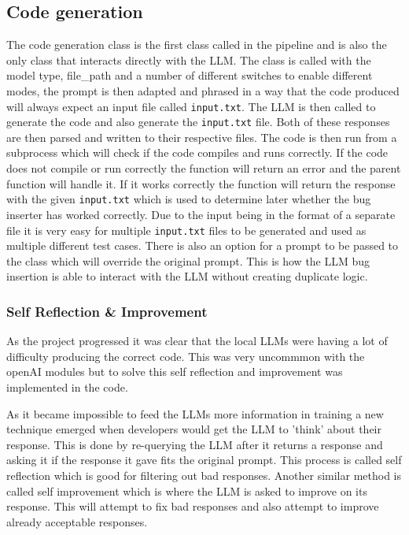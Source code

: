 \documentclass[12pt]{extarticle}
\begin{document}
\subsection{Code generation}

The code generation class is the first class called in the pipeline and is also the only class that interacts directly with the LLM. The class is called with the model type, file\_path and a number of different switches to enable different modes, the prompt is then adapted and phrased in a way that the code produced will always expect an input file called \texttt{input.txt}. The LLM is then called to generate the code and also generate the \texttt{input.txt} file. Both of these responses are then parsed and written to their respective files. The code is then run from a subprocess which will check if the code compiles and runs correctly. If the code does not compile or run correctly the function will return an error and the parent function will handle it. If it works correctly the function will return the response with the given \texttt{input.txt} which is used to determine later whether the bug inserter has worked correctly. Due to the input being in the format of a separate file it is very easy for multiple \texttt{input.txt} files to be generated and used as multiple different test cases. 
There is also an option for a prompt to be passed to the class which will override the original prompt. This is how the LLM bug insertion is able to interact with the LLM without creating duplicate logic. 

\subsubsection{Self Reflection \& Improvement}

As the project progressed it was clear that the local LLMs were having a lot of difficulty producing the correct code. This was very uncommmon with the openAI modules but to solve this self reflection and improvement was implemented in the code. 

As it became impossible to feed the LLMs more information in training a new technique emerged when developers would get the LLM to 'think' about their response. This is done by re-querying the LLM after it returns a response and asking it if the response it gave fits the original prompt. This process is called self reflection \cite{shinn2023} which is good for filtering out bad responses. Another similar method is called self improvement which is where the LLM is asked to improve on its response. This will attempt to fix bad responses and also attempt to improve already acceptable responses.
\end{document}
